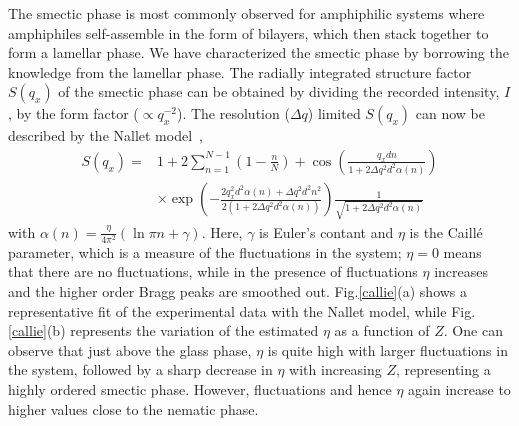 \documentclass[aps,prl,preprint,superscriptaddress]{revtex4-1} %
\begin{document}
The smectic phase is most commonly observed for amphiphilic systems where amphiphiles self-assemble in the form of bilayers, which then stack together to form a lamellar phase. We have characterized the smectic phase by borrowing the knowledge from the lamellar phase. The radially integrated structure factor $S(q_x)$ of the smectic phase can be obtained by dividing the recorded intensity, $I$, by the form factor ($\propto q_x^{-2}$). The resolution ($\Delta q$) limited $S(q_x)$ can now be described by the Nallet model~\cite{nallet1993modelling}, 
\begin{equation}
\label{eq1:}
\begin{split}
S(q_x) = &1+2\sum_{n=1}^{N-1} (1-\frac{n}{N}) +\cos(\frac{q_x d n}{1+2\Delta q^2 d^2 \alpha(n)})\\
&\times\exp(-\frac{2q_x^2 d^2\alpha(n)+\Delta q^2 d^2 n^2}{2(1+2\Delta q^2 d^2 \alpha(n))})\frac{1}{\sqrt{1+2\Delta q^2 d^2 \alpha (n)}}
\end{split}
\end{equation}
\noindent with $\alpha(n)=\frac{\eta}{4\pi^2}(\ln \pi n + \gamma)$. Here, $\gamma$ is Euler's contant and $\eta$ is the Caill\'{e} parameter, which is a measure of the fluctuations in the system; $\eta=0$ means that there are no fluctuations, while in the presence of fluctuations $\eta$ increases and the higher order Bragg peaks are smoothed out. Fig.\ref{callie}(a) shows a representative fit of the experimental data with the Nallet model, while Fig.\ref{callie}(b) represents the variation of the estimated $\eta$ as a function of $Z$. One can observe that just above the glass phase, $\eta$ is quite high with larger fluctuations in the system, followed by a sharp decrease in $\eta$ with increasing $Z$, representing a highly ordered smectic phase. However, fluctuations and hence $\eta$ again increase to higher values close to the nematic phase.\par  
\end{document}
